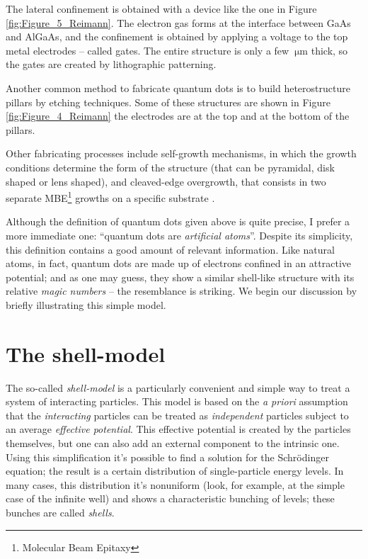 The lateral confinement is obtained with a device like the one in Figure \ref{fig:Figure_5_Reimann}. The electron gas forms at the interface between GaAs and AlGaAs, and the confinement is obtained by applying a voltage to the top metal electrodes -- called gates. The entire structure is only a few $\SI{}{\micro\meter}$ thick, so the gates are created by lithographic patterning.

Another common method to fabricate quantum dots is to build heterostructure pillars by etching techniques. Some of these structures are shown in Figure \ref{fig:Figure_4_Reimann} the electrodes are at the top and at the bottom of the pillars.

Other fabricating processes include self-growth mechanisms, in which the growth conditions determine the form of the structure (that can be pyramidal, disk shaped or lens shaped), and cleaved-edge overgrowth, that consists in two separate MBE\footnote{Molecular Beam Epitaxy} growths on a specific substrate \citep[see][]{Reimann2002}.

Although the definition of quantum dots given above is quite precise, I prefer a more immediate one: ``quantum dots are \emph{artificial atoms}''. Despite its simplicity, this definition contains a good amount of relevant information. Like natural atoms, in fact, quantum dots are made up of electrons confined in an attractive potential; and as one may guess, they show a similar shell-like structure with its relative \emph{magic numbers} -- the resemblance is striking. We begin our discussion by briefly illustrating this simple model.

\section{The shell-model}
\label{sec:shell_model}
The so-called \emph{shell-model} is a particularly convenient and simple way to treat a system of interacting particles. This model is based on the \emph{a priori} assumption that the \emph{interacting} particles can be treated as \emph{independent} particles subject to an average \emph{effective potential}. This effective potential is created by the particles themselves, but one can also add an external component to the intrinsic one. Using this simplification it's possible to find a solution for the Schr\"{o}dinger equation; the result is a certain distribution of single-particle energy levels. In many cases, this distribution it's nonuniform (look, for example, at the simple case of the infinite well) and shows a characteristic bunching of levels; these bunches are called \emph{shells}.

